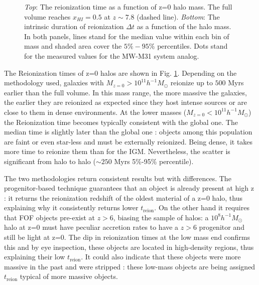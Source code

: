 \documentclass[twocolumn]{aastex61}
\begin{document}
\begin{figure}[ht]
\caption{\textit{Top}: The reionization time as a function of z=0 halo mass.
The full volume reaches $x_{HI}=0.5$ at $z\sim 7.8$ (dashed line). %
 \textit{Bottom}: The intrinsic duration of reionization  $\Delta t$ as a function of the halo mass. In both panels, lines stand for the median value within each bin of mass and  shaded area cover the $5\%-95\%$ percentiles. Dots stand for the measured values for the MW-M31 system analog.}
\label{fig:treion}
\end{figure}

The Reionization times of z=0 halos are shown in Fig. \ref{fig:treion}. Depending on the methodology used, galaxies with $M_{z=0}>10^{11} h^{-1}M_\odot$ reionize up to $500$ Myrs earlier than the full volume. In this mass range, the more massive the galaxies, the earlier they are reionized as expected since they host intense sources or are close to them in dense environments. At the lower masses ($M_{z=0}<10^{11} h^{-1}M_\odot$) the Reionization time becomes typically consistent with the global one.  The median time is slightly later than the global one : objects among this population are faint or even star-less and must be externally reionized. Being dense, it takes more time to reionize them than for the IGM.  Nevertheless, the scatter is significant from halo to halo ($\sim 250$ Myrs 5\%-95\% percentile).

The two methodologies return consistent results but with differences. The progenitor-based technique guarantees that an object is already present at high z : it returns the reionization redshift of the oldest material of a z=0 halo, thus explaining why it consistently returns lower $t_\mathrm{reion}$. On the other hand it requires that FOF objects pre-exist at $z>6$, biasing the sample of halos:  a $10^8 h^{-1} M_\odot$ halo at z=0  must have peculiar accretion rates to have a $z>6$ progenitor and still be light at z=0. The dip in reionization times at the low mass end confirms this and  by eye inspection, these objects are located in high-density regions, thus explaining their low $t_\mathrm{reion}$. It could also indicate that these objects were more massive in the past and were stripped : these low-mass objects are being assigned $t_\mathrm{reion}$ typical of more massive objects.
\end{document}

